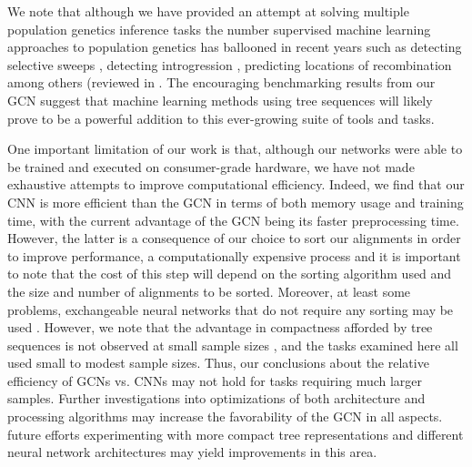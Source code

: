 We note that although we have provided an attempt at solving multiple population genetics inference tasks the number supervised machine learning approaches to population genetics has ballooned in recent years such as detecting selective sweeps \cite{hejaseDeepLearningApproachInference2022,kernDiploSHICUpdated2018,whitehouseTimesweeperAccuratelyIdentifying2023}, detecting introgression \cite{gowerDetectingAdaptiveIntrogression2021,rayIntroUNETIdentifyingIntrogressed2023,schriderSupervisedMachineLearning2018a}, predicting locations of recombination \cite{adrionPredictingLandscapeRecombination2020} among others (reviewed in \cite{flagelUnreasonableEffectivenessConvolutional2019,korfmannDeepLearningPopulation2023a,schriderSupervisedMachineLearning2018}. The encouraging benchmarking results from our GCN suggest that machine learning methods using tree sequences will likely prove to be a powerful addition to this ever-growing suite of tools and tasks. 

One important limitation of our work is that, although our networks were able to be trained and executed on consumer-grade hardware, we have not made exhaustive attempts to improve computational efficiency. Indeed, we find that our CNN is more efficient than the GCN in terms of both memory usage and training time, with the current advantage of the GCN being its faster preprocessing time. However, the latter is a consequence of our choice to sort our alignments in order to improve performance, a computationally expensive process \cite{rayIntroUNETIdentifyingIntrogressed2023} and it is important to note that the cost of this step will depend on the sorting algorithm used and the size and number of alignments to be sorted. Moreover, at least some problems, exchangeable neural networks that do not require any sorting may be used \cite{chanLikelihoodFreeInferenceFramework2018}. However, we note that the advantage in compactness afforded by tree sequences is not observed at small sample sizes \cite{kelleherInferringWholegenomeHistories2019}, and the tasks examined here all used small to modest sample sizes. Thus, our conclusions about the relative efficiency of GCNs vs. CNNs may not hold for tasks requiring much larger samples. Further investigations into optimizations of both architecture and processing algorithms may increase the favorability of the GCN in all aspects. future efforts experimenting with more compact tree representations \cite{hallerTreesequenceRecordingSLiM2019,kelleherEfficientPedigreeRecording2018,kelleherInferringWholegenomeHistories2019,mahmoudiBayesianInferenceAncestral2022,ralphEfficientlySummarizingRelationships2020} and different neural network architectures may yield improvements in this area.


